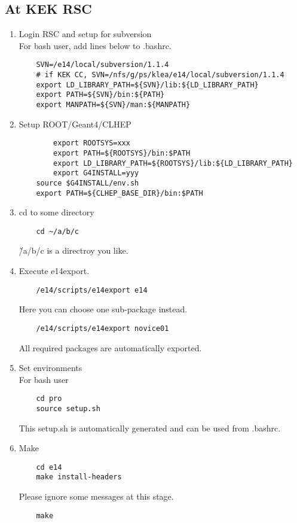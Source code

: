 \documentclass[a4paper,12pt]{article}
\begin{document}
  \subsection{At KEK RSC}
  \begin{enumerate}
   \item Login RSC and setup for subversion\\
	 For bash user, add lines below to .bashrc.
	 \begin{verbatim}
	SVN=/e14/local/subversion/1.1.4
	# if KEK CC, SVN=/nfs/g/ps/klea/e14/local/subversion/1.1.4
	export LD_LIBRARY_PATH=${SVN}/lib:${LD_LIBRARY_PATH}
	export PATH=${SVN}/bin:${PATH}
	export MANPATH=${SVN}/man:${MANPATH}	
	 \end{verbatim}
   \item Setup ROOT/Geant4/CLHEP
	 \begin{verbatim}
        export ROOTSYS=xxx
        export PATH=${ROOTSYS}/bin:$PATH
        export LD_LIBRARY_PATH=${ROOTSYS}/lib:${LD_LIBRARY_PATH}
        export G4INSTALL=yyy
	source $G4INSTALL/env.sh
	export PATH=${CLHEP_BASE_DIR}/bin:$PATH
	 \end{verbatim}
   \item cd to some directory
	 \begin{verbatim}
	cd ~/a/b/c	
	 \end{verbatim}
	 \~/a/b/c is a directroy you like.
   \item Execute e14export.
	 \begin{verbatim}
	/e14/scripts/e14export e14
	 \end{verbatim}
	 Here you can choose one sub-package instead.
	 \begin{verbatim}
	/e14/scripts/e14export novice01
	 \end{verbatim}
	 All required packages are automatically exported.
   \item Set environments\\
	 For bash user
	 \begin{verbatim}
	cd pro
	source setup.sh	
	 \end{verbatim}
	 This setup.sh is automatically generated and can be used from
	 .bashrc.
   \item Make
	 \begin{verbatim}
	cd e14
	make install-headers
	 \end{verbatim}
	 Please ignore some messages at this stage.
	 \begin{verbatim}
	make
	 \end{verbatim}
  \end{enumerate}
\end{document}
